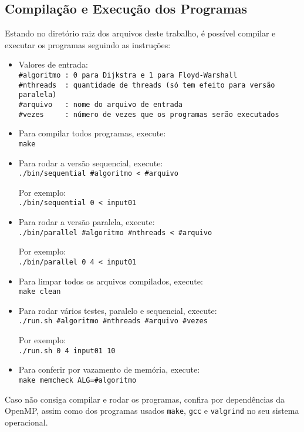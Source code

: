 \subsection{Compilação e Execução dos Programas}

Estando no diretório raiz dos arquivos deste trabalho, é possível compilar e executar os programas seguindo as instruções:

\begin{itemize}
	\item Valores de entrada: \\
		\verb|#algoritmo : 0 para Dijkstra e 1 para Floyd-Warshall| \\
		\verb|#nthreads  : quantidade de threads (só tem efeito para versão paralela)| \\
		\verb|#arquivo   : nome do arquivo de entrada| \\
		\verb|#vezes     : número de vezes que os programas serão executados|

	\item Para compilar todos programas, execute: \\
		\verb|make|

	\item Para rodar a versão sequencial, execute: \\
		\verb|./bin/sequential #algoritmo < #arquivo|

		Por exemplo: \\
		\verb|./bin/sequential 0 < input01|

	\item Para rodar a versão paralela, execute: \\
		\verb|./bin/parallel #algoritmo #nthreads < #arquivo|

		Por exemplo: \\
		\verb|./bin/parallel 0 4 < input01|

	\item Para limpar todos os arquivos compilados, execute: \\
		\verb|make clean|
		
	\item Para rodar vários testes, paralelo e sequencial, execute: \\
		\verb|./run.sh #algoritmo #nthreads #arquivo #vezes|

		Por exemplo: \\
		\verb|./run.sh 0 4 input01 10|

	\item Para conferir por vazamento de memória, execute: \\
		\verb|make memcheck ALG=#algoritmo|

\end{itemize}

Caso não consiga compilar e rodar os programas, confira por dependências
da OpenMP, assim como dos programas usados \texttt{make}, \texttt{gcc} e \texttt{valgrind}
no seu sistema operacional.

